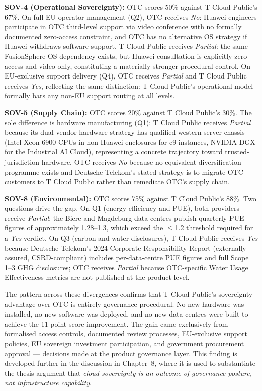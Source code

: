 \textbf{SOV-4 (Operational Sovereignty):} OTC scores 50\% against T Cloud Public's 67\%. On full EU-operator management (Q2), OTC receives \textit{No}: Huawei engineers participate in OTC third-level support via video conference with no formally documented zero-access constraint, and OTC has no alternative OS strategy if Huawei withdraws software support. T Cloud Public receives \textit{Partial}: the same FusionSphere OS dependency exists, but Huawei consultation is explicitly zero-access and video-only, constituting a materially stronger procedural control. On EU-exclusive support delivery (Q4), OTC receives \textit{Partial} and T Cloud Public receives \textit{Yes}, reflecting the same distinction: T Cloud Public's operational model formally bars any non-EU support routing at all levels.

\textbf{SOV-5 (Supply Chain):} OTC scores 20\% against T Cloud Public's 30\%. The sole difference is hardware manufacturing (Q1): T Cloud Public receives \textit{Partial} because its dual-vendor hardware strategy has qualified western server chassis (Intel Xeon 6900 CPUs in non-Huawei enclosures for c9 instances, NVIDIA DGX for the Industrial AI Cloud), representing a concrete trajectory toward trusted-jurisdiction hardware. OTC receives \textit{No} because no equivalent diversification programme exists and Deutsche Telekom's stated strategy is to migrate OTC customers to T Cloud Public rather than remediate OTC's supply chain.

\textbf{SOV-8 (Environmental):} OTC scores 75\% against T Cloud Public's 88\%. Two questions drive the gap. On Q1 (energy efficiency and PUE), both providers receive \textit{Partial}: the Biere and Magdeburg data centres publish quarterly PUE figures of approximately 1.28--1.3, which exceed the $\leq$1.2 threshold required for a \textit{Yes} verdict. On Q3 (carbon and water disclosures), T Cloud Public receives \textit{Yes} because Deutsche Telekom's 2024 Corporate Responsibility Report (externally assured, CSRD-compliant) includes per-data-centre PUE figures and full Scope 1--3 GHG disclosures; OTC receives \textit{Partial} because OTC-specific Water Usage Effectiveness metrics are not published at the product level.

The pattern across these divergences confirms that T Cloud Public's sovereignty advantage over OTC is entirely governance-procedural. No new hardware was installed, no new software was deployed, and no new data centres were built to achieve the 11-point score improvement. The gain came exclusively from formalised access controls, documented review processes, EU-exclusive support policies, EU sovereign investment participation, and government procurement approval — decisions made at the product governance layer. This finding is developed further in the discussion in Chapter~8, where it is used to substantiate the thesis argument that \emph{cloud sovereignty is an outcome of governance posture, not infrastructure capability}.

